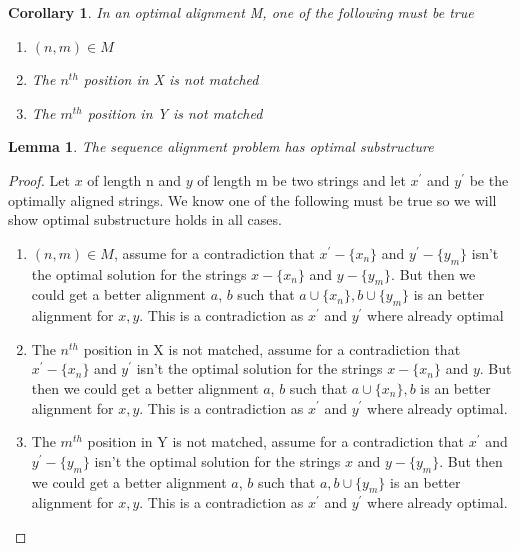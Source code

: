 \documentclass{article}
\newtheorem{cor}{Corollary}[thm]
\newtheorem{lemma}{Lemma}[thm]
\begin{document}
		\begin{cor}
			In an optimal alignment M, one of the following must be true
			
			\begin{enumerate}
				\item $(n,m) \in M$
				\item The $n^{th}$ position in X is not matched
				\item The $m^{th}$ position in Y is not matched
			\end{enumerate}
		\end{cor}
		
		\begin{lemma}
			The sequence alignment problem has optimal substructure
		\end{lemma}
		
		\begin{proof}
			Let $x$ of length n and $y$ of length m be two strings and let $x^\prime$ and $y^\prime$ be the optimally aligned strings. We know one of the following must be true so we will show optimal substructure holds in all cases.
			
			\begin{enumerate}
				\item $(n,m) \in M$, assume for a contradiction that $x^\prime - \{x_n\}$ and $y^\prime - \{y_m\}$ isn't the optimal solution for the strings $x - \{x_n\}$ and $y - \{y_m\}$. But then we could get a better alignment $a$, $b$ such that $a \cup \{x_n\}, b \cup \{y_m\}$ is an better alignment for $x, y$. This is a contradiction as $x^\prime$ and $y^\prime$ where already optimal
				
				\item The $n^{th}$ position in X is not matched, assume for a contradiction that $x^\prime - \{x_n\}$ and $y^\prime$ isn't the optimal solution for the strings $x - \{x_n\}$ and $y$. But then we could get a better alignment $a$, $b$ such that $a \cup \{x_n\}, b$ is an better alignment for $x, y$. This is a contradiction as $x^\prime$ and $y^\prime$ where already optimal.
				
				\item The $m^{th}$ position in Y is not matched, assume for a contradiction that $x^\prime$ and $y^\prime - \{y_m\}$ isn't the optimal solution for the strings $x$ and $y  - \{y_m\}$. But then we could get a better alignment $a$, $b$ such that $a, b \cup \{y_m\}$ is an better alignment for $x, y$. This is a contradiction as $x^\prime$ and $y^\prime$ where already optimal.
			\end{enumerate}
		\end{proof}
  		
\end{document}
